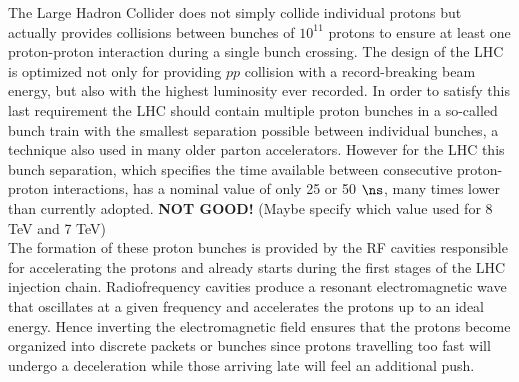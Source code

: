 The Large Hadron Collider does not simply collide individual protons but actually provides collisions between bunches of $10^{11}$ protons to ensure at least one proton-proton interaction during a single bunch crossing. The design of the LHC is optimized not only for providing $pp$ collision with a record-breaking beam energy, but also with the highest luminosity ever recorded. In order to satisfy this last requirement the LHC should contain multiple proton bunches in a so-called bunch train with the smallest separation possible between individual bunches, a technique also used in many older parton accelerators. 
However for the LHC this bunch separation, which specifies the time available between consecutive proton-proton interactions, has a nominal value of only 25 or 50 $\ns$, many times lower than currently adopted. \textbf{NOT GOOD!} (Maybe specify which value used for 8 TeV and 7 TeV)
\\
The formation of these proton bunches is provided by the RF cavities responsible for accelerating the protons and already starts during the first stages of the LHC injection chain. 
Radiofrequency cavities produce a resonant electromagnetic wave that oscillates at a given frequency and accelerates the protons up to an ideal energy.
Hence inverting the electromagnetic field ensures that the protons become organized into discrete packets or bunches since protons travelling too fast will undergo a deceleration while those arriving late will feel an additional push.
